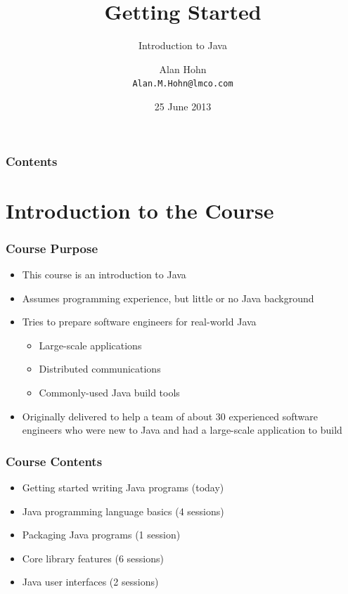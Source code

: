 \documentclass{beamer}
\title[]{Getting Started}
\subtitle{Introduction to Java}
\author{Alan Hohn\\
\texttt{Alan.M.Hohn@lmco.com}}
\date{25 June 2013}
\begin{document}
\begin{frame}
   \titlepage
\end{frame}

\begin{frame}
   \frametitle{Contents}
   \tableofcontents[]
\end{frame}

\section{Introduction to the Course}
\begin{frame}
\frametitle{Course Purpose}
\begin{itemize}
\item This course is an introduction to Java
\item Assumes programming experience, but little or no Java background
\item Tries to prepare software engineers for real-world Java
\begin{itemize}
\item Large-scale applications
\item Distributed communications
\item Commonly-used Java build tools
\end{itemize}
\item Originally delivered to help a team of about 30 experienced software engineers who were new to Java and had a large-scale application to build
\end{itemize}
\end{frame}

\begin{frame}
\frametitle{Course Contents}
\begin{itemize}
\item Getting started writing Java programs (today)
\item Java programming language basics (4 sessions)
\item Packaging Java programs (1 session)
\item Core library features (6 sessions)
\item Java user interfaces (2 sessions)
\end{itemize}
\end{frame}
\end{document}
